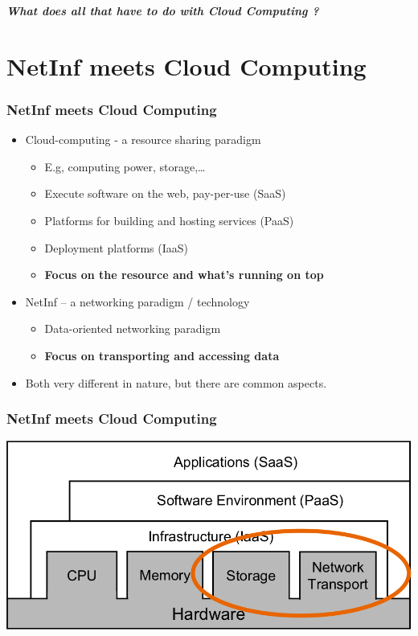 \documentclass [12pt] {beamer}
\begin{document}
\begin{frame}
 \begin{center}
    \textbf{\emph{What does all that have to do with Cloud Computing ?}}
 \end{center}

\end{frame}

\section{NetInf meets Cloud Computing}
\begin{frame}
\frametitle{NetInf meets Cloud Computing}
\begin{itemize}
 \item Cloud-computing - a resource sharing paradigm
       \begin{itemize}
        \item E.g, computing power, storage,\dots
        \item Execute software on the web, pay-per-use (SaaS)
        \item Platforms for building and hosting services (PaaS)
        \item Deployment platforms (IaaS)
        \item \textbf{ Focus on the resource and what’s running on top}
       \end{itemize}
\item NetInf – a networking paradigm / technology
       \begin{itemize}
        \item Data-oriented networking paradigm
        \item \textbf{Focus on transporting and accessing data}
       \end{itemize}
\item Both very different in nature, but there are common aspects.
\end{itemize}

\end{frame}


\begin{frame}
\frametitle{NetInf meets Cloud Computing}
 \begin{center}
  \includegraphics[keepaspectratio=true,scale=.25]{netinf8.png}
 \end{center}

\end{frame}
\end{document}
